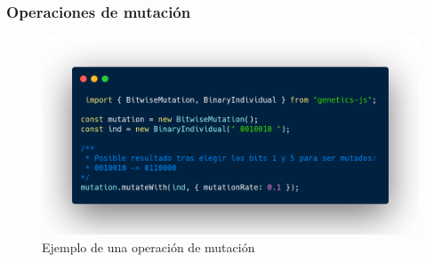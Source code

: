 \documentclass{beamer}
\begin{document}
\begin{frame}
\frametitle{Operaciones de mutación}

\begin{figure}
    \centering
    \includegraphics[scale=0.23]{pres/img/desarrollo/mutation-example.png}
    \caption{Ejemplo de una operación de mutación}
    \label{fig:my_label}
\end{figure}

\end{frame}
\end{document}
